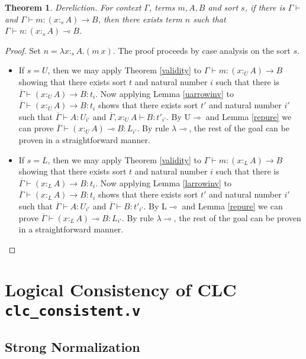 \documentclass{article}
\newtheorem{theorem}{Theorem}[section]
\theoremstyle{definition}
\newcommand{\rname}[1]{\textsc{\footnotesize #1}}
\newcommand{\utype}{:_{\scriptscriptstyle U}}
\newcommand{\ltype}{:_{\scriptscriptstyle L}}
\newcommand{\stype}[1]{:_{#1}}
\begin{document}
\begin{theorem}
  Dereliction. For context $\Gamma$, terms $m, A, B$ and sort $s$, if there is $\Gamma \vdash$ and $\Gamma \vdash m : (x \stype{s} A) \rightarrow B$, then there exists term $n$ such that $\Gamma \vdash n : (x \stype{s} A) \multimap B$.
\end{theorem}
\begin{proof}
  Set $n = \lambda x \stype{s} A . (m\ x)$. The proof proceeds by case analysis on the sort $s$.
  \begin{itemize}
    \item If $s = U$, then we may apply Theorem \ref{validity} to $\Gamma \vdash m : (x \utype A) \rightarrow B$ showing that there exists sort $t$ and natural number $i$ such that there is $\overline{\Gamma} \vdash (x \utype A) \rightarrow B : t_i$. Now applying Lemma \ref{uarrowinv} to $\overline{\Gamma} \vdash (x \utype A)\rightarrow B : t_i$ shows that there exists sort $t'$ and natural number $i'$ such that $\overline{\Gamma} \vdash A : U_{i'}$ and $\overline{\Gamma}, x \utype A \vdash B : t'_{i'}$. By \rname{U$\multimap$} and Lemma \ref{repure} we can prove $\overline{\Gamma} \vdash (x \utype A) \multimap B : L_{i'}$. By rule \rname{$\lambda$$\multimap$}, the rest of the goal can be proven in a straightforward manner.
    \item If $s = L$, then we may apply Theorem \ref{validity} to $\Gamma \vdash m : (x \ltype A) \rightarrow B$ showing that there exists sort $t$ and natural number $i$ such that there is $\overline{\Gamma} \vdash (x \ltype A) \rightarrow B : t_i$. Now applying Lemma \ref{larrowinv} to $\overline{\Gamma} \vdash (x \ltype A)\rightarrow B : t_i$ shows that there exists sort $t'$ and natural number $i'$ such that $\overline{\Gamma} \vdash A : U_{i'}$ and $\overline{\Gamma} \vdash B : t'_{i'}$. By \rname{L$\multimap$} and Lemma \ref{repure} we can prove $\overline{\Gamma} \vdash (x \ltype A) \multimap B : L_{i'}$. By rule \rname{$\lambda$$\multimap$}, the rest of the goal can be proven in a straightforward manner.
  \end{itemize}
\end{proof}

\section{Logical Consistency of CLC \texttt{clc_consistent.v}}

\subsection{Strong Normalization}
\end{document}
